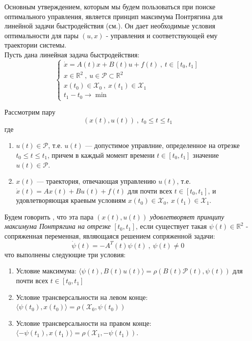 \documentclass[10pt]{article}
\begin{document}

Основным утверждением, которым мы будем пользоваться при поиске оптимального управления, является принцип максимума Понтрягина для линейной задачи быстродействия (см.\cite{1}). Он дает необходимые условия оптимальности для пары \( (u, x)\) - управления и соответствующей ему траектории системы.\bigskip \\
Пусть дана линейная задача быстродействия:
\begin{equation}
 \begin{cases}
   \dot{x} = A(t)x + B(t)u + f(t) \ , \ t \in [t_0, t_1]
   \\
   x \in \mathbb{R}^2 \ , \ u \in \mathcal{P} \subset \mathbb{R}^2
   \\
   x(t_0) \in \mathcal{X}_0 \ , \ x(t_1) \in \mathcal{X}_1
   \\
   t_1 - t_0 \to \min
 \end{cases}
 \label{problem}
\end{equation}

\noindent Рассмотрим пару
\[ (x(t), u(t)) \ , \ t_0 \leq t \leq t_1 \]
где
\begin{enumerate}
 	\item \(u(t) \in \mathcal{P}\), т.е. \( u(t) \) --- допустимое управлние, определенное на отрезке \( t_0 \leq t \leq t_1 \), причем в каждый момент времени \(t \in [t_0, t_1] \) значение \( u(t) \in \mathcal{P} \).
 	\item \( x(t) \) --- траектория, отвечающая управлению \( u(t) \), т.е. \( \dot{x}(t) = Ax(t) + Bu(t) + f(t) \) для почти всех \( t \in [t_0, t_1] \), и удовлетворяющая краевым условиям \( x(t_0) \in \mathcal{X}_0, \ x(t_1) \in \mathcal{X}_1 \).
\end{enumerate}
Будем говорить , что эта пара \( (x(t), u(t)) \) \emph{удовлетворяет принципу максимума Понтрягина на отрезке} \( [t_0, t_1] \), если существует такая \( \psi(t) \in \mathbb{R}^2\) - сопряженная переменная, являющаяся решением сопряженной задачи:
\[ \dot{\psi}(t) = -A^T(t) \psi(t) \ , \ \psi(t) \neq 0\]
что выполнены следующие три условия:
\begin{enumerate}
	\item Условие максимума: \( \langle \psi(t), B(t)u(t) \rangle = \rho(B(t) \mathcal{P}(t) , \psi(t))\) для почти всех \( t \in [t_0, t_1] \)
	\item Условие трансверсальности на левом конце: \( \langle \psi(t_0), x(t_0) \rangle = \rho(\mathcal{X}_0 , \psi(t_0))\)
	\item Условие трансверсальности на правом конце: \(\langle -\psi(t_1), x(t_1) \rangle = \rho(\mathcal{X}_1 , -\psi(t_1)).\)
\end{enumerate}
\end{document}
